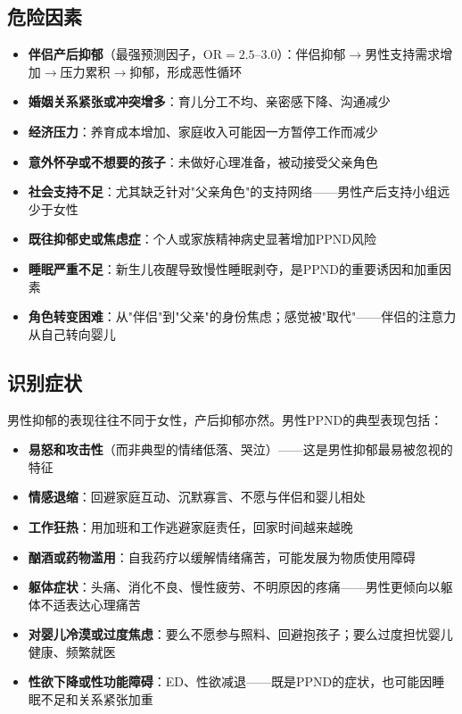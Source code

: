 \subsection{危险因素}

\begin{itemize}[leftmargin=2cm]
	\item \textbf{伴侣产后抑郁}（最强预测因子，OR$=2.5$--3.0）：伴侣抑郁$\rightarrow$男性支持需求增加$\rightarrow$压力累积$\rightarrow$抑郁，形成恶性循环
	\item \textbf{婚姻关系紧张或冲突增多}：育儿分工不均、亲密感下降、沟通减少
	\item \textbf{经济压力}：养育成本增加、家庭收入可能因一方暂停工作而减少
	\item \textbf{意外怀孕或不想要的孩子}：未做好心理准备，被动接受父亲角色
	\item \textbf{社会支持不足}：尤其缺乏针对"父亲角色"的支持网络——男性产后支持小组远少于女性
	\item \textbf{既往抑郁史或焦虑症}：个人或家族精神病史显著增加PPND风险
	\item \textbf{睡眠严重不足}：新生儿夜醒导致慢性睡眠剥夺，是PPND的重要诱因和加重因素
	\item \textbf{角色转变困难}：从"伴侣"到"父亲"的身份焦虑；感觉被"取代"——伴侣的注意力从自己转向婴儿
\end{itemize}

\subsection{识别症状}

男性抑郁的表现往往不同于女性，产后抑郁亦然。男性PPND的典型表现包括：

\begin{itemize}[leftmargin=2cm]
	\item \textbf{易怒和攻击性}（而非典型的情绪低落、哭泣）——这是男性抑郁最易被忽视的特征
	\item \textbf{情感退缩}：回避家庭互动、沉默寡言、不愿与伴侣和婴儿相处
	\item \textbf{工作狂热}：用加班和工作逃避家庭责任，回家时间越来越晚
	\item \textbf{酗酒或药物滥用}：自我药疗以缓解情绪痛苦，可能发展为物质使用障碍
	\item \textbf{躯体症状}：头痛、消化不良、慢性疲劳、不明原因的疼痛——男性更倾向以躯体不适表达心理痛苦
	\item \textbf{对婴儿冷漠或过度焦虑}：要么不愿参与照料、回避抱孩子；要么过度担忧婴儿健康、频繁就医
	\item \textbf{性欲下降或性功能障碍}：ED、性欲减退——既是PPND的症状，也可能因睡眠不足和关系紧张加重
\end{itemize}

